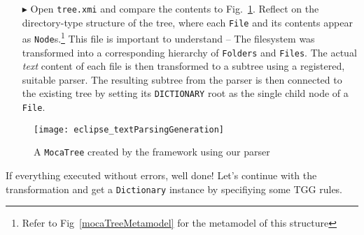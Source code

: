 \begin{itemize}

\item[$\blacktriangleright$] Open \texttt{tree.xmi} and compare the contents to Fig.~\ref{eclipse:treeResult}. Reflect on the directory-type structure of the
tree, where each \texttt{File} and its contents appear as \texttt{Node}s.\footnote{Refer to Fig~\ref{mocaTreeMetamodel} for the metamodel of this structure}
This file is important to understand -- The filesystem was transformed into a corresponding hierarchy of \texttt{Folders} and \texttt{Files}. The actual
\emph{text} content of each file is then transformed to a subtree using a registered, suitable parser. The resulting subtree from the parser is then connected
to the existing tree by setting its \texttt{DICTIONARY} root as the single child node of a \texttt{File}.

\end{itemize}

\vspace{0.5cm}

\begin{figure}[!htbp]
\begin{center}
 \texttt{[image: eclipse\_textParsingGeneration]}
  \caption{A \texttt{MocaTree} created by the framework using our parser}
  \label{eclipse:treeResult}
\end{center}
\end{figure}

If everything executed without errors, well done! Let's continue with the transformation and get a \texttt{Dictionary} instance by specifiying some
TGG rules.
